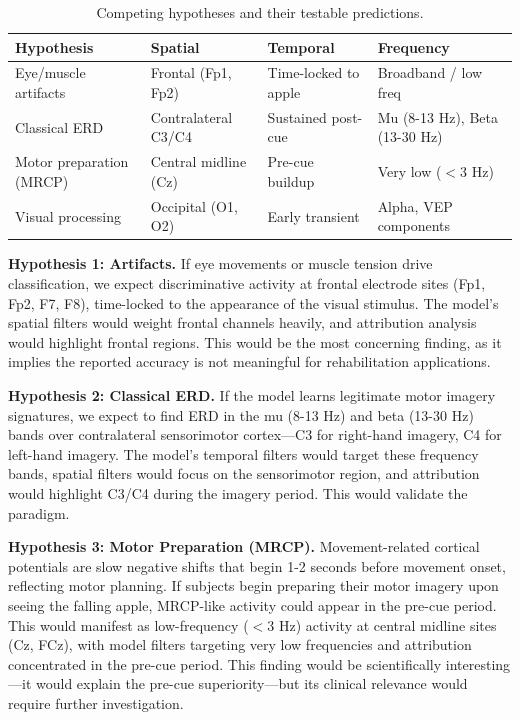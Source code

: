 \begin{table}[htbp]
\centering
\caption{Competing hypotheses and their testable predictions.}
\label{tab:hypotheses}
\begin{tabular}{@{}llll@{}}
\toprule
\textbf{Hypothesis} & \textbf{Spatial} & \textbf{Temporal} & \textbf{Frequency} \\
\midrule
Eye/muscle artifacts & Frontal (Fp1, Fp2) & Time-locked to apple & Broadband / low freq \\
Classical ERD & Contralateral C3/C4 & Sustained post-cue & Mu (8-13 Hz), Beta (13-30 Hz) \\
Motor preparation (MRCP) & Central midline (Cz) & Pre-cue buildup & Very low ($<$3 Hz) \\
Visual processing & Occipital (O1, O2) & Early transient & Alpha, VEP components \\
\bottomrule
\end{tabular}
\end{table}

\textbf{Hypothesis 1: Artifacts.} If eye movements or muscle tension drive classification, we expect discriminative activity at frontal electrode sites (Fp1, Fp2, F7, F8), time-locked to the appearance of the visual stimulus. The model's spatial filters would weight frontal channels heavily, and attribution analysis would highlight frontal regions. This would be the most concerning finding, as it implies the reported accuracy is not meaningful for rehabilitation applications.

\textbf{Hypothesis 2: Classical ERD.} If the model learns legitimate motor imagery signatures, we expect to find ERD in the mu (8-13 Hz) and beta (13-30 Hz) bands over contralateral sensorimotor cortex—C3 for right-hand imagery, C4 for left-hand imagery. The model's temporal filters would target these frequency bands, spatial filters would focus on the sensorimotor region, and attribution would highlight C3/C4 during the imagery period. This would validate the paradigm.

\textbf{Hypothesis 3: Motor Preparation (MRCP).} Movement-related cortical potentials are slow negative shifts that begin 1-2 seconds before movement onset, reflecting motor planning. If subjects begin preparing their motor imagery upon seeing the falling apple, MRCP-like activity could appear in the pre-cue period. This would manifest as low-frequency ($<$3 Hz) activity at central midline sites (Cz, FCz), with model filters targeting very low frequencies and attribution concentrated in the pre-cue period. This finding would be scientifically interesting—it would explain the pre-cue superiority—but its clinical relevance would require further investigation.

